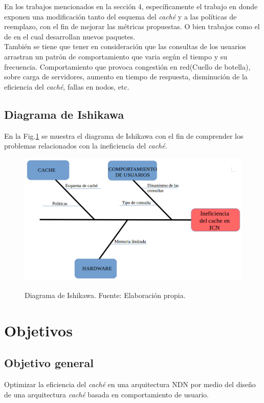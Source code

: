 \documentclass[12pt]{ociamthesis}  %
\begin{document}
En los trabajos mencionados en la sección 4, específicamente el trabajo \cite{tarnoi2014performance} en donde exponen una modificación tanto del esquema del \textit{caché} y a las políticas de reemplazo, con el fin de mejorar las métricas propuestas. O bien trabajos como el de \cite{mun2017cache} en el cual desarrollan nuevos paquetes.\\

También se tiene que tener en consideración que las consultas de los usuarios arrastran un patrón de comportamiento que varia según el tiempo y su frecuencia. Comportamiento que provoca congestión en red(Cuello de botella), sobre carga de servidores, aumento en tiempo de respuesta, disminución de la eficiencia del \textit{caché}, fallas en nodos, etc.\\

\subsection{Diagrama de Ishikawa}
En la Fig.\ref{diagrama_ishikawa} se muestra el diagrama de Ishikawa con el fin de
comprender los problemas relacionados con la ineficiencia del \textit{caché}.

\begin{figure}[!htb]
	\centering
	\includegraphics[width=12cm]{Imagenes/Diagrama_ishikawa}\\
	\caption{Diagrama de Ishikawa. Fuente: Elaboración propia.}
	\label{diagrama_ishikawa}
\end{figure}
\section{Objetivos}
\subsection{Objetivo general}
Optimizar la eficiencia del \textit{caché} en una arquitectura NDN por medio del diseño de una arquitectura \textit{caché} basada en comportamiento de usuario.
\end{document}
